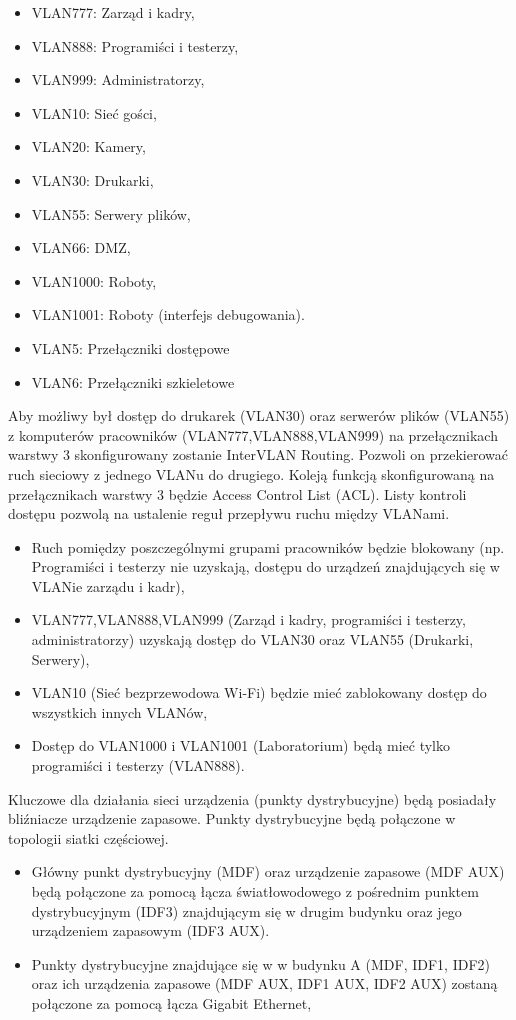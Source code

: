 \documentclass[12pt,a4paper,titlepage]{article}
\begin{document}
\begin{itemize}
    \item VLAN777: Zarząd i kadry,
    \item VLAN888: Programiści i testerzy,
    \item VLAN999: Administratorzy,
    \item VLAN10: Sieć gości,
    \item VLAN20: Kamery,
    \item VLAN30: Drukarki,
    \item VLAN55: Serwery plików,
    \item VLAN66: DMZ,
    \item VLAN1000: Roboty,
    \item VLAN1001: Roboty (interfejs debugowania).
    \item VLAN5: Przełączniki dostępowe 
    \item VLAN6: Przełączniki szkieletowe 
\end{itemize}
Aby możliwy był dostęp do drukarek (VLAN30) oraz serwerów plików (VLAN55) z komputerów pracowników (VLAN777,VLAN888,VLAN999) na
przełącznikach warstwy 3 skonfigurowany zostanie InterVLAN Routing. Pozwoli on przekierować
ruch sieciowy z jednego VLANu do drugiego.
Koleją funkcją skonfigurowaną na przełącznikach warstwy 3 będzie Access Control List (ACL).
Listy kontroli dostępu pozwolą na ustalenie reguł przepływu ruchu między VLANami.

\begin{itemize}
    \item Ruch pomiędzy poszczególnymi grupami pracowników będzie blokowany (np. Programiści i testerzy nie uzyskają,
dostępu do urządzeń znajdujących się w VLANie zarządu i kadr),
    \item VLAN777,VLAN888,VLAN999 (Zarząd i kadry, programiści i testerzy, administratorzy) uzyskają dostęp do VLAN30 oraz VLAN55 (Drukarki, Serwery),
    \item VLAN10 (Sieć bezprzewodowa Wi-Fi) będzie mieć zablokowany dostęp do wszystkich innych VLANów,
    \item Dostęp do VLAN1000 i VLAN1001 (Laboratorium) będą mieć tylko programiści i testerzy (VLAN888).
\end{itemize}

Kluczowe dla działania sieci urządzenia (punkty dystrybucyjne) będą posiadały bliźniacze urządzenie
zapasowe. Punkty dystrybucyjne będą połączone w topologii siatki częściowej.

\begin{itemize}
    \item Główny punkt dystrybucyjny (MDF) oraz urządzenie zapasowe (MDF AUX) będą połączone za pomocą łącza światłowodowego z pośrednim punktem dystrybucyjnym (IDF3) znajdującym się w drugim budynku oraz jego urządzeniem zapasowym (IDF3 AUX).
    \item Punkty dystrybucyjne znajdujące się w w budynku A (MDF, IDF1, IDF2) oraz ich urządzenia zapasowe (MDF AUX, IDF1 AUX, IDF2 AUX) zostaną połączone za pomocą łącza Gigabit Ethernet,
\end{itemize}
\end{document}
